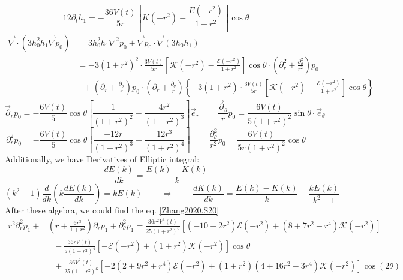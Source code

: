 \documentclass[books,12pt]{elegantpaper}
\newcommand{\tens}{\ \ \ \ \ \ \ \ \ \ }
\begin{document}
$$ 12 \partial_t h_1 = - \frac{36 \dot{V}(t)}{5r} \left[ K(-r^2) - \frac{E(-r^2)}{1+r^2} \right] \cos\theta $$
$$ \begin{align}
\vec\nabla \cdot (3h_0^2 h_1 \vec\nabla p_0) &= 3 h_0^2 h_1 \nabla^2 p_0 + \vec\nabla p_0 \cdot \vec\nabla(3h_0h_1) \\ %
&= - 3(1+r^2)^2 \cdot \frac{3V(t)}{5r} \left[ \mathcal{K} (-r^2) - \frac{\mathcal{E} (-r^2)}{1+r^2} \right] \cos\theta \cdot \left( \partial_r^2 + \frac{\partial_\theta^2}{r^2} \right) p_0 \\
&\ \ \ + \left( \partial_r + \frac{\partial_\theta}{r} \right) p_0 \cdot \left( \partial_r + \frac{\partial_\theta}{r} \right) \left\{ - 3(1+r^2) \cdot \frac{3V(t)}{5r} \left[ \mathcal{K} (-r^2) - \frac{\mathcal{E} (-r^2)}{1+r^2} \right] \cos\theta \right\} %
\end{align} $$
$$ \vec\partial_r p_0 = - \frac{6V(t)}{5} \cos\theta \left[ \frac{1}{(1+r^2)^2} - \frac{4r^2}{(1+r^2)^3} \right] \vec{e}_r \tens  \frac{\vec\partial_\theta}{r} p_0 = \frac{6 V(t)}{5 (1+r^2)^2} \sin\theta \cdot \vec{e}_\theta $$
$$ \partial_r^2 p_0 = - \frac{6V(t)}{5} \cos\theta \left[ \frac{-12r}{(1+r^2)^3} + \frac{12 r^3}{(1+r^2)^4} \right] \tens \frac{\partial_\theta^2}{r^2} p_0 = \frac{6V(t)}{5 r (1+r^2)^2} \cos\theta $$
Additionally, we have Derivatives of Elliptic integral:
$$ \frac{d E(k)}{dk} = \frac{E(k) - K(k)}{k} $$
$$ (k^2 - 1) \frac{d}{dk} \left( k \frac{dE(k)}{dk} \right) = kE(k) \tens \Rightarrow \tens \frac{dK(k)}{dk} = \frac{E(k) - K(k)}{k} - \frac{k E(k)}{k^2 - 1} $$
After these algebra, we could find the eq. \ref{Zhang2020.S20}
\begin{equation} \begin{align}
r^2 \partial_r^2 p_1 +& \left( r + \frac{6r^3}{1+r^2} \right) \partial_r p_1 + \partial_\theta^2 p_1 = \frac{36 r^2 V^2(t)}{25(1+r^2)^6} \left[ (-10+2r^2) \mathcal{E}(-r^2) + (8+7r^2-r^4) \mathcal{K}(-r^2) \right] \\ %
&\ \ \ - \frac{36 r \dot{V}(t)}{5(1+r^2)^4} \left[ -\mathcal{E}(-r^2) + (1+r^2)\mathcal{K}(-r^2) \right] \cos\theta \\ %
&\ \ \ + \frac{36 V^2(t)}{25(1+r^2)^6} \left[ -2(2 + 9r^2 + r^4) \mathcal{E}(-r^2) + (1+r^2) (4+16r^2-3r^4) \mathcal{K}(-r^2) \right] \cos(2\theta) %
\end{align} \tag{Zhang2020.S20} \label{Zhang2020.S20} \end{equation}
\end{document}

